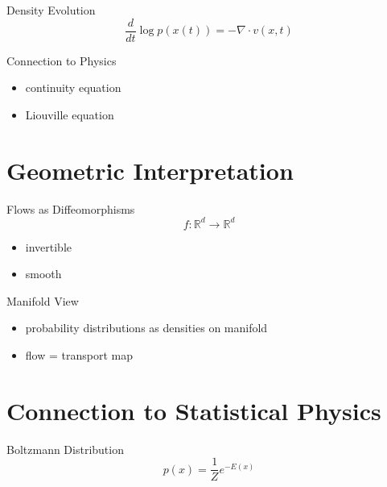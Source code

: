 \documentclass{beamer}
\begin{document}
\begin{frame}{Density Evolution}
\[
\frac{d}{dt} \log p(x(t)) = -\nabla \cdot v(x,t)
\]
\end{frame}


\begin{frame}{Connection to Physics}
\begin{itemize}
\item continuity equation
\item Liouville equation
\end{itemize}
\end{frame}

\section{Geometric Interpretation}

\begin{frame}{Flows as Diffeomorphisms}
\[
f: \mathbb{R}^d \rightarrow \mathbb{R}^d
\]

\begin{itemize}
\item invertible
\item smooth
\end{itemize}
\end{frame}


\begin{frame}{Manifold View}
\begin{itemize}
\item probability distributions as densities on manifold
\item flow = transport map
\end{itemize}
\end{frame}

\section{Connection to Statistical Physics}

\begin{frame}{Boltzmann Distribution}
\[
p(x) = \frac{1}{Z} e^{-E(x)}
\]
\end{frame}
\end{document}
